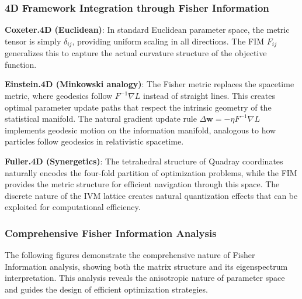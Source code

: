 \documentclass[
  10pt,
]{article}
\begin{document}
\hypertarget{d-framework-integration-through-fisher-information}{%
\subsubsection{4D Framework Integration through Fisher
Information}\label{d-framework-integration-through-fisher-information}}

\textbf{Coxeter.4D (Euclidean)}: In standard Euclidean parameter space,
the metric tensor is simply \(\delta_{ij}\), providing uniform scaling
in all directions. The FIM \(F_{ij}\) generalizes this to capture the
actual curvature structure of the objective function.

\textbf{Einstein.4D (Minkowski analogy)}: The Fisher metric replaces the
spacetime metric, where geodesics follow \(F^{-1}\nabla L\) instead of
straight lines. This creates optimal parameter update paths that respect
the intrinsic geometry of the statistical manifold. The natural gradient
update rule \(\Delta \mathbf{w} = -\eta F^{-1}\nabla L\) implements
geodesic motion on the information manifold, analogous to how particles
follow geodesics in relativistic spacetime.

\textbf{Fuller.4D (Synergetics)}: The tetrahedral structure of Quadray
coordinates naturally encodes the four-fold partition of optimization
problems, while the FIM provides the metric structure for efficient
navigation through this space. The discrete nature of the IVM lattice
creates natural quantization effects that can be exploited for
computational efficiency.

\hypertarget{comprehensive-fisher-information-analysis}{%
\subsubsection{Comprehensive Fisher Information
Analysis}\label{comprehensive-fisher-information-analysis}}

The following figures demonstrate the comprehensive nature of Fisher
Information analysis, showing both the matrix structure and its
eigenspectrum interpretation. This analysis reveals the anisotropic
nature of parameter space and guides the design of efficient
optimization strategies.
\end{document}
